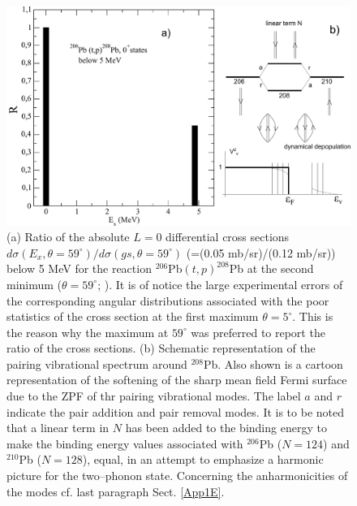 \begin{figure}
\centerline{\includegraphics*[width=\textwidth,angle=0]{nutshell/figs/Excited0Pb206tp.pdf}}
\caption{(a) Ratio of the absolute $L=0$ differential cross sections $d\sigma(E_x,\theta=59^{\circ})/d\sigma(gs,\theta=59^{\circ})$ (=(0.05 mb/sr)/(0.12 mb/sr)) below 5 MeV  for the reaction $^{206}$Pb$(t,p)^{208}$Pb at the second minimum ($\theta=59^{\circ}$; \cite{Bjerregaard:66b}). It is of notice the large experimental errors of the corresponding angular distributions associated with the poor statistics of the cross section at the first maximum $\theta=5^{\circ}$. This is the reason why the maximum at $59^\circ$ was preferred to report the ratio of the cross sections. (b) Schematic representation of the pairing vibrational spectrum around $^{208}$Pb. Also shown is a cartoon representation of the softening of the sharp mean field Fermi surface due to the ZPF of thr pairing vibrational modes. The label $a$ and $r$ indicate the pair addition and pair removal modes. It is to be noted that a linear term in $N$ has been added to the binding energy to make the binding energy values associated with $^{206}$Pb ($N=124$) and $^{210}$Pb ($N=128$), equal, in an attempt to emphasize a harmonic picture for the two--phonon state. Concerning the anharmonicities of the modes cf. last paragraph Sect. \ref{App1E}.}\label{fig1.1}
\end{figure}



